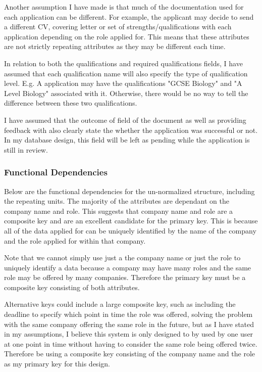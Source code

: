 \documentclass{article}
\begin{document}
Another assumption I have made is that much of the documentation used for each application can be different. For example, the applicant may decide to send a different CV, covering letter or set of strengths/qualifications with each application depending on the role applied for. This means that these attributes are not strictly repeating attributes as they may be different each time.

In relation to both the qualifications and required qualifications fields, I have assumed that each qualification name will also specify the type of qualification level. E.g. A application may have the qualifications "GCSE Biology" and "A Level Biology" associated with it. Otherwise, there would be no way to tell the difference between these two qualifications.

I have assumed that the outcome of field of the document as well as providing feedback with also clearly state the whether the application was successful or not. In my database design, this field will be left as pending while the application is still in review.

\subsubsection{Functional Dependencies}
\label{sec:func}
Below are the functional dependencies for the un-normalized structure, including the repeating units. The majority of the attributes are dependant on the company name and role. This suggests that company name and role are a composite key and are an excellent candidate for the primary key. This is because all of the data applied for can be uniquely identified by the name of the company and the role applied for within that company. 

Note that we cannot simply use just a the company name or just the role to uniquely identify a data because a company may have many roles and the same role may be offered by many companies. Therefore the primary key must be a composite key consisting of both attributes. 

Alternative keys could include a large composite key, such as including the deadline to specify which point in time the role was offered, solving the problem with the same company offering the same role in the future, but as I have stated in my assumptions, I believe this system is only designed to by used by one user at one point in time without having to consider the same role being offered twice. Therefore be using a composite key consisting of the company name and the role as my primary key for this design.
\end{document}
